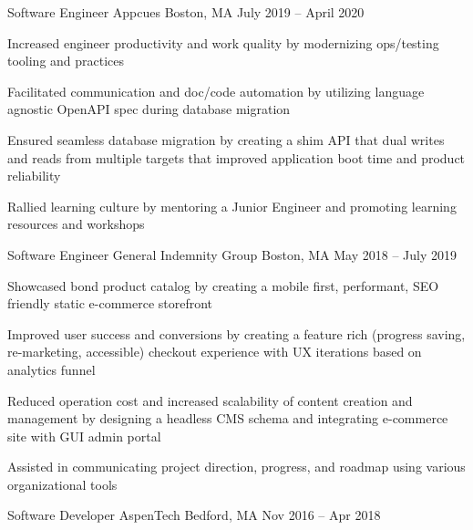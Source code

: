 \documentclass[]{awesome-cv}
\begin{document}
\begin{cventries}
	\cventry
	{Software Engineer}
	{Appcues}
	{Boston, MA}
	{July 2019 – April 2020}
	{\begin{cvitems}
		\item {Increased engineer productivity and work quality by modernizing ops/testing tooling and practices}
		\item {Facilitated communication and doc/code automation by utilizing language agnostic OpenAPI spec during database migration}
		\item {Ensured seamless database migration by creating a shim API that dual writes and reads from multiple targets that improved application boot time and product reliability}
		\item {Rallied learning culture by mentoring a Junior Engineer and promoting learning resources and workshops}
		\end{cvitems}}
	\cventry
	{Software Engineer}
	{General Indemnity Group}
	{Boston, MA}
	{May 2018 – July 2019}
	{\begin{cvitems}
		\item {Showcased bond product catalog by creating a mobile first, performant, SEO friendly static e-commerce storefront}
		\item {Improved user success and conversions by creating a feature rich (progress saving, re-marketing, accessible) checkout experience with UX iterations based on analytics funnel}
		\item {Reduced operation cost and increased scalability of content creation and management by designing a headless CMS schema and integrating e-commerce site with GUI admin portal}
		\item {Assisted in communicating project direction, progress, and roadmap using various organizational tools}
		\end{cvitems}}
	\cventry
	{Software Developer}
	{AspenTech}
	{Bedford, MA}
	{Nov 2016 – Apr 2018}
	{\begin{cvitems}
		\end{cvitems}}
	\vspace{-5mm}
\end{cventries}
\end{document}
